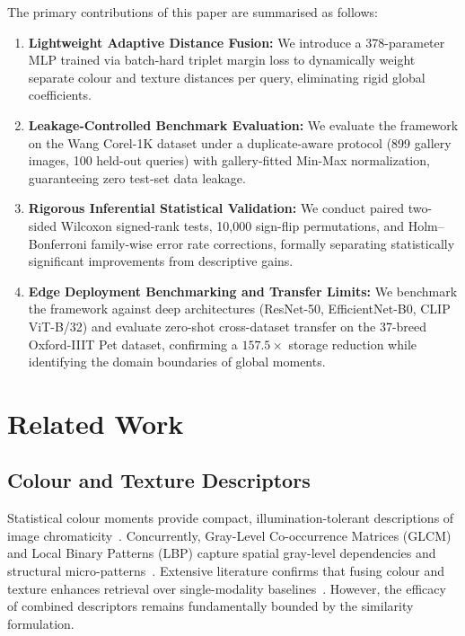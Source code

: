 \documentclass[pdflatex,sn-mathphys-num]{sn-jnl}
\begin{document}
The primary contributions of this paper are summarised as follows:
\begin{enumerate}
    \item \textbf{Lightweight Adaptive Distance Fusion:} We introduce a 378-parameter MLP trained via batch-hard triplet margin loss to dynamically weight separate colour and texture distances per query, eliminating rigid global coefficients.
    \item \textbf{Leakage-Controlled Benchmark Evaluation:} We evaluate the framework on the Wang Corel-1K dataset under a duplicate-aware protocol (899 gallery images, 100 held-out queries) with gallery-fitted Min-Max normalization, guaranteeing zero test-set data leakage.
    \item \textbf{Rigorous Inferential Statistical Validation:} We conduct paired two-sided Wilcoxon signed-rank tests, 10,000 sign-flip permutations, and Holm--Bonferroni family-wise error rate corrections, formally separating statistically significant improvements from descriptive gains.
    \item \textbf{Edge Deployment Benchmarking and Transfer Limits:} We benchmark the framework against deep architectures (ResNet-50, EfficientNet-B0, CLIP ViT-B/32) and evaluate zero-shot cross-dataset transfer on the 37-breed Oxford-IIIT Pet dataset, confirming a $157.5\times$ storage reduction while identifying the domain boundaries of global moments.
\end{enumerate}

\section{Related Work}\label{sec2}
\subsection{Colour and Texture Descriptors}
Statistical colour moments provide compact, illumination-tolerant descriptions of image chromaticity~\cite{stricker1995similarity}. Concurrently, Gray-Level Co-occurrence Matrices (GLCM) and Local Binary Patterns (LBP) capture spatial gray-level dependencies and structural micro-patterns~\cite{ojala2002multiresolution,chun2008cbir}. Extensive literature confirms that fusing colour and texture enhances retrieval over single-modality baselines~\cite{singh2018color,yue2011cbir,wang2014content}. However, the efficacy of combined descriptors remains fundamentally bounded by the similarity formulation.
\end{document}
